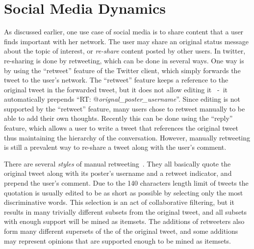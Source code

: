 \documentclass[letterpaper,12pt,titlepage,oneside,final]{book}
\begin{document}
\section{Social Media Dynamics}

As discussed earlier, one use case of social media %
is to
share content that a user finds important with her network.
The user may share an original status message about the 
topic of interest, or \emph{re-share} content posted by other users.
In twitter, re-sharing is done by retweeting,
which can be done in several ways.
One way is by using the ``retweet'' feature of the Twitter client,
which simply forwards the tweet to the user's network.
The ``retweet'' feature keeps a reference to the original tweet
in the forwarded tweet, but it does not allow editing it
~-~it automatically prepends ``RT: @\emph{orignal\_poster\_username}''.
Since editing is not supported by the ``retweet'' feature, 
many users chose to retweet manually 
to be able to add their own thoughts.
Recently this can be done using the ``reply'' feature,
which allows a user to write a tweet 
that references the original tweet
thus
maintaining the hierarchy of the conversation.
However, manually retweeting is still a prevalent
way to re-share a tweet along with the user's comment.

There are several \emph{styles} of manual retweeting~\cite{boyd2010tweet}.
They all basically 
quote the original tweet along 
with its poster's username and a retweet indicator,
and prepend the user's comment.
Due to the 140 characters length limit of tweets the quotation is usually 
edited to be as short as possible 
by selecting only the most discriminative words. 
This selection is an act of collaborative filtering,
but it results in many trivially different subsets from the original tweet,
and all subsets with enough support will be mined as itemsets.
The additions of retweeters also form many different supersets of the of the
original tweet, and some additions may represent opinions that are supported
enough to be mined as itemsets. 
\end{document}
